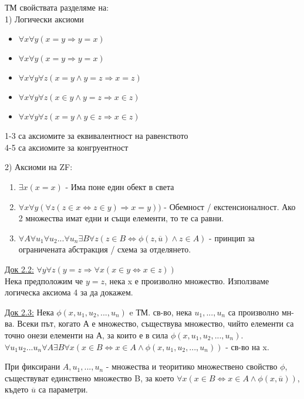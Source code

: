 \documentclass[fleqn, titlepage, 12pt]{report}
\begin{document}
ТМ свойствата разделяме на: \\
1) Логически аксиоми
\begin{itemize}
  \item $\forall{x}\forall{y}(x = y \Rightarrow y = x)$
  \item $\forall x \forall y (x = y \Rightarrow y = x)$
  \item $\forall{x}\forall{y}\forall{z}(x = y \land y = z \Rightarrow x = z)$
  \item $\forall{x}\forall{y}\forall{z}(x \in y \land y = z \Rightarrow x \in z)$
  \item $\forall{x}\forall{y}\forall{z}(x = y \land y \in z \Rightarrow x \in z)$
\end{itemize}
1-3 са аксиомите за еквивалентност на равенството\\
4-5 са аксиомите за конгруентност
\bigbreak

2) Аксиоми на ZF:
\begin{enumerate}
  \item $\exists{x}(x = x)$  - Има поне един обект в света
  \item $\forall{x}\forall{y}(\forall{z}(z \in x \Leftrightarrow z \in y) \Rightarrow x = y))$
- Обемност / екстенсионалност. Ако 2 множества имат едни и същи елементи, то те са равни.
  \item $\forall{A}\forall{u_1}\forall{u_2}...\forall{u_n}\exists{B}\forall{z}(z \in B \Leftrightarrow \phi(z, \overline{u}) \land z \in A)$ - принцип за ограничената абстракция / схема за отделянето.
\end{enumerate}
\underline{Док 2.2:} $\forall{y}\forall{z}(y = z \Rightarrow \forall{x}(x \in y \Leftrightarrow x \in z))$ \\
Нека предположим че $y = z$, нека x е произволно множество. Използваме логическа аксиома 4 за да докажем.
\bigbreak

\underline{Док 2.3:} Нека $\phi (x, u_1, u_2, ... , u_n)$ e ТМ. св-во, нека $u_1, ..., u_n$ са произволно мн-ва.
Всеки път, когато А е множество, съществува множество, чийто елементи са точно онези елементи на А, за които е в сила
$\phi (x, u_1, u_2, ..., u_n)$. \\
$\forall{u_1 u_2 ... u_n}\forall{A}\exists{B}\forall{x}(x \in B \Leftrightarrow x \in A \land \phi (
x, u_1, u_2, ..., u_n
)) $ - св-во на x.
\bigbreak

 При фиксирани $A, u_1, ..., u_n$ - множества и теоритико множествено свойство $\phi$,\\
съществуват единствено множество B, за което
$\forall{x}(x \in B \Leftrightarrow x \in A \land \phi (x, \overline{u}))$, където $\overline{u}$ са параметри.
\bigbreak
\end{document}
